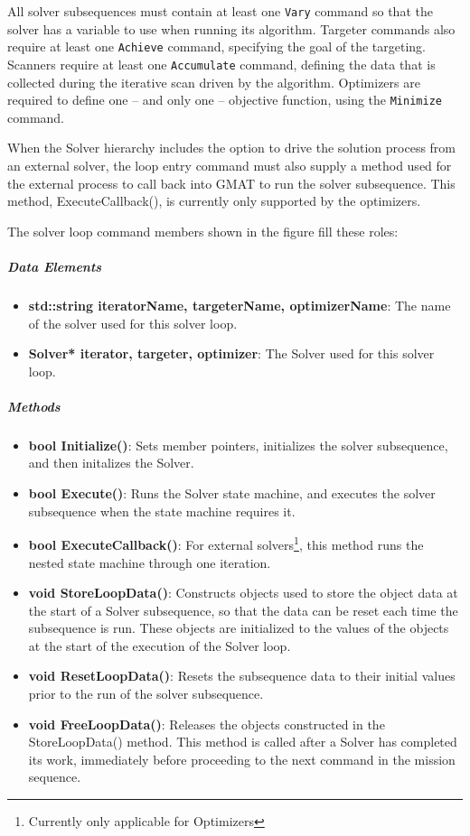 \noindent All solver subsequences must contain at least one \texttt{Vary} command so that the
solver has a variable to use when running its algorithm.  Targeter commands also require at least
one \texttt{Achieve} command, specifying the goal of the targeting.  Scanners require at least one
\texttt{Accumulate} command, defining the data that is collected during the iterative scan driven
by the algorithm.  Optimizers are required to define one -- and only one -- objective function,
using the \texttt{Minimize} command.

When the Solver hierarchy includes the option to drive the solution process from an external
solver, the loop entry command must also supply a method used for the external process to call back
into GMAT to run the solver subsequence.  This method, ExecuteCallback(), is currently only
supported by the optimizers.

The solver loop command members shown in the figure fill these roles:

\subparagraph{Data Elements}

\begin{itemize}
\item \textbf{std::string iteratorName, targeterName, optimizerName}: The name of the solver used
for this solver loop.
\item \textbf{Solver* iterator, targeter, optimizer}: The Solver used for this solver loop.
\end{itemize}

\subparagraph{Methods}

\begin{itemize}
\item \textbf{bool Initialize()}: Sets member pointers, initializes the solver subsequence, and then
initalizes the Solver.
\item \textbf{bool Execute()}: Runs the Solver state machine, and executes the solver subsequence
when the state machine requires it.
\item \textbf{bool ExecuteCallback()}: For external solvers\footnote{Currently only applicable for
Optimizers}, this method runs the nested state machine through one iteration.
\item \textbf{void StoreLoopData()}: Constructs objects used to store the object data at the start
of a Solver subsequence, so that the data can be reset each time the subsequence is run.  These
objects are initialized to the values of the objects at the start of the execution of the Solver
loop.
\item \textbf{void ResetLoopData()}: Resets the subsequence data to their initial values prior to
the run of the solver subsequence.
\item \textbf{void FreeLoopData()}: Releases the objects constructed in the StoreLoopData() method.
This method is called after a Solver has completed its work, immediately before proceeding to the
next command in the mission sequence.
\end{itemize}

